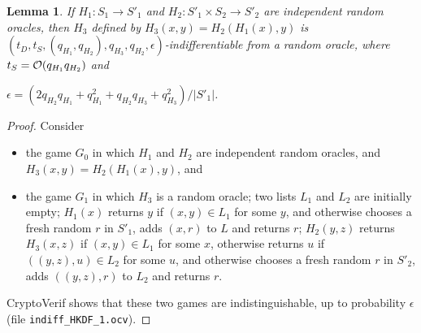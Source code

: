 \documentclass[compsoc, conference, letterpaper, 10pt, times]{IEEEtran}
\newif\ifapproxproba
\newtheorem{lemma}{Lemma}
\begin{document}
\begin{lemma}\label{lem:hcomp1}
If $H_1 : S_1 \rightarrow S'_1$ and $H_2 : S'_1 \times S_2 \rightarrow S'_2$ 
are independent random oracles, then $H_3$ defined by $H_3(x,y) = H_2(H_1(x),y)$
is $(t_D, t_S, (q_{H_1}, q_{H_2}), q_{H_3}, q_{H_2}, \epsilon)$-indifferentiable from a random oracle, where $t_S = {\cal O}(q_{H_1} q_{H_2})$ and
\ifapproxproba
$\epsilon = {\cal O}((q_{H_2}q_{H_1} + q_{H_1}^2 + q_{H_2}q_{H_3} + q_{H_3}^2)/|S'_1|)$ and ${\cal O}$ just hides small constants.
\else
$\epsilon = (2q_{H_2}q_{H_1} + q_{H_1}^2 + q_{H_2}q_{H_3} + q_{H_3}^2)/|S'_1|$.
\fi
\end{lemma}
\begin{proof}
Consider
\begin{itemize}[leftmargin=*]
\item  the game $G_0$ in which $H_1$ and $H_2$ are independent random oracles,
  and $H_3(x,y) = H_2(H_1(x),y)$, and
\item the game $G_1$ in which 
  $H_3$ is a random oracle;
  two lists $L_1$ and $L_2$ are initially empty;
  $H_1(x)$ returns $y$ if $(x,y) \in L_1$ for some $y$, 
  and otherwise chooses a fresh random $r$ in $S'_1$,
  adds $(x,r)$ to $L$ and returns $r$;
  $H_2(y,z)$ returns $H_3(x,z)$ if $(x,y) \in L_1$ for some $x$,
  otherwise returns $u$ if $((y,z),u) \in L_2$ for some $u$,
  and otherwise chooses a fresh random $r$ in $S'_2$,
  adds $((y,z),r)$ to $L_2$ and returns $r$.
\end{itemize}
CryptoVerif shows that these two games are indistinguishable,
up to probability $\epsilon$ (file \texttt{indiff\_HKDF\_1.ocv}).
\end{proof}
\end{document}

